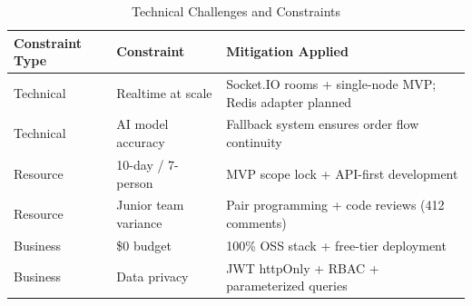 \begin{table}[H]
\centering
\caption{Technical Challenges and Constraints}
\label{tab:constraints}
\begin{tabularx}{\textwidth}{@{}p{}p{}p{}@{}}
\toprule
\textbf{Constraint Type} & \textbf{Constraint} & \textbf{Mitigation Applied} \\
\midrule

Technical & Realtime at scale & Socket.IO rooms + single-node MVP; Redis adapter planned \\

Technical & AI model accuracy & Fallback system ensures order flow continuity \\

Resource & 10-day / 7-person & MVP scope lock + API-first development \\

Resource & Junior team variance & Pair programming + code reviews (412 comments) \\

Business & \$0 budget & 100\% OSS stack + free-tier deployment \\

Business & Data privacy & JWT httpOnly + RBAC + parameterized queries \\

\bottomrule
\end{tabularx}
\end{table}
